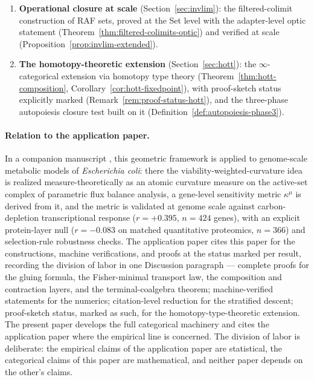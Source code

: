 \documentclass[11pt,a4paper]{article}
\theoremstyle{plain}
\theoremstyle{definition}
\theoremstyle{remark}
\begin{document}
\begin{enumerate}[leftmargin=*,itemsep=2pt]
projected CPTP channel contraction
(Theorem~\ref{thm:zeno-contraction}) settling the Zeno
self-reference resolution.
\item \textbf{Operational closure at scale}
(Section~\ref{sec:invlim}): the filtered-colimit construction of
RAF sets, proved at the
Set level with the adapter-level optic statement
(Theorem~\ref{thm:filtered-colimits-optic}) and verified at scale
(Proposition~\ref{prop:invlim-extended}).
\item \textbf{The homotopy-theoretic extension}
(Section~\ref{sec:hott}): the $\infty$-categorical extension via
homotopy type theory
(Theorem~\ref{thm:hott-composition},
Corollary~\ref{cor:hott-fixedpoint}), with proof-sketch status
explicitly marked (Remark~\ref{rem:proof-status-hott}), and the
three-phase autopoiesis closure test built on it
(Definition~\ref{def:autopoiesis-phase3}).
\end{enumerate}

\paragraph{Relation to the application paper.}
In a companion manuscript \citep{zai2026measure}, this geometric
framework is applied to genome-scale metabolic models of
\emph{Escherichia coli}: there the
viability-weighted-curvature idea is realized measure-theoretically
as an atomic curvature measure on the active-set complex of
parametric flux balance analysis, a gene-level sensitivity metric
$\kappa^{\mu}$ is derived from it, and the metric is validated at
genome scale against carbon-depletion transcriptional response
($r = +0.395$, $n = 424$ genes), with an explicit protein-layer null
($r = -0.083$ on matched quantitative proteomics, $n = 366$) and
selection-rule robustness checks. The application paper cites this
paper for the constructions, machine verifications, and proofs at
the status marked per result, recording the division of labor in
one Discussion paragraph --- complete proofs for the gluing
formula, the Fisher-minimal transport law, the composition and
contraction layers, and the terminal-coalgebra theorem;
machine-verified statements for the numerics; citation-level
reduction for the stratified descent; proof-sketch status, marked
as such, for the homotopy-type-theoretic extension. The present
paper develops the full categorical machinery and cites the
application paper where the empirical line is concerned. The division of labor is
deliberate: the empirical claims of the application paper are
statistical, the categorical claims of this
paper are mathematical, and neither paper depends on the other's
claims.
\end{document}
